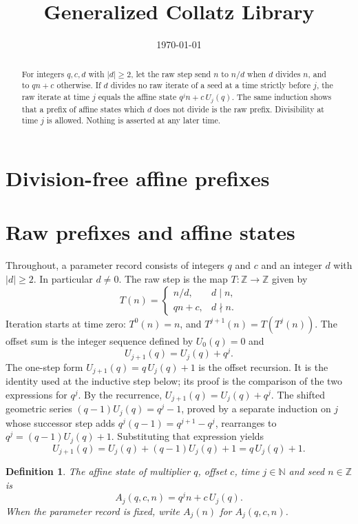 \documentclass[11pt,letterpaper]{article}
\title{Generalized Collatz Library}
\author{}
\date{\today}
\newcommand{\N}{\mathbb{N}}
\newcommand{\Z}{\mathbb{Z}}
\newcommand{\Map}[3]{#1 \colon #2 \to #3}
\newtheorem{definition}[theorem]{Definition}
\begin{document}
\maketitle
\section*{Division-free affine prefixes}

\begin{abstract}
For integers \(q,c,d\) with \(|d|\ge2\), let the raw step send \(n\) to
\(n/d\) when \(d\) divides \(n\), and to \(qn+c\) otherwise. If \(d\) divides no raw iterate of a seed at a time strictly before \(j\), the raw iterate at time \(j\) equals the affine state \(q^{j}n+c\,U_{j}(q)\). The same induction shows that a prefix of affine states which \(d\) does not divide is the raw prefix. Divisibility at time \(j\) is allowed. Nothing is asserted at any later time.
\end{abstract}

\section{Raw prefixes and affine states}

Throughout, a parameter record consists of integers \(q\) and \(c\) and an integer \(d\) with \(|d|\ge 2\). In particular \(d\neq 0\). The raw step is the map \(\Map{T}{\Z}{\Z}\) given by
\[
T(n)=\begin{cases}
n/d, & d\mid n,\\
qn+c, & d\nmid n.
\end{cases}
\]
Iteration starts at time zero: \(T^{0}(n)=n\), and \(T^{j+1}(n)=T(T^{j}(n))\). The offset sum is the integer sequence defined by \(U_{0}(q)=0\) and
\[
U_{j+1}(q)=U_{j}(q)+q^{j}.
\]
The one-step form \(U_{j+1}(q)=q\,U_{j}(q)+1\) is the offset recursion. It is the identity used at the inductive step below; its proof is the comparison of the two expressions for \(q^{j}\). By the recurrence, \(U_{j+1}(q)=U_{j}(q)+q^{j}\). The shifted geometric series \((q-1)U_{j}(q)=q^{j}-1\), proved by a separate induction on \(j\) whose successor step adds \(q^{j}(q-1)=q^{j+1}-q^{j}\), rearranges to \(q^{j}=(q-1)U_{j}(q)+1\). Substituting that expression yields
\[
U_{j+1}(q)=U_{j}(q)+(q-1)U_{j}(q)+1=q\,U_{j}(q)+1.
\]

\begin{definition}\label{Def:AffineState}
The affine state of multiplier \(q\), offset \(c\), time \(j\in\N\) and seed \(n\in\Z\) is
\[
A_{j}(q,c,n)=q^{j}n+c\,U_{j}(q).
\]
When the parameter record is fixed, write \(A_{j}(n)\) for \(A_{j}(q,c,n)\).
\end{definition}
\end{document}
